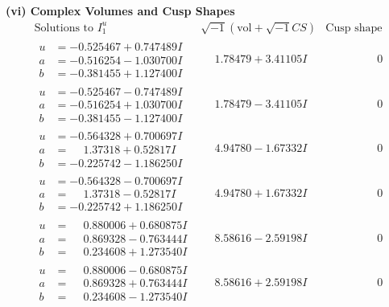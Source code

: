 \documentclass[1p]{elsarticle_modified}
\theoremstyle{definition}
\newcommand{\I}{\sqrt{-1}}
\begin{document}
\newpage\flushleft \textbf{(vi) Complex Volumes and Cusp Shapes}
$$\begin{array}{c|c|c}  
\text{Solutions to }I^u_{1}& \I (\text{vol} + \sqrt{-1}CS) & \text{Cusp shape}\\
 \hline 
\begin{aligned}
u &= -0.525467 + 0.747489 I \\
a &= -0.516254 - 1.030700 I \\
b &= -0.381455 + 1.127400 I\end{aligned}
 & \phantom{-}1.78479 + 3.41105 I & \phantom{-0.000000 } 0 \\ \hline\begin{aligned}
u &= -0.525467 - 0.747489 I \\
a &= -0.516254 + 1.030700 I \\
b &= -0.381455 - 1.127400 I\end{aligned}
 & \phantom{-}1.78479 - 3.41105 I & \phantom{-0.000000 } 0 \\ \hline\begin{aligned}
u &= -0.564328 + 0.700697 I \\
a &= \phantom{-}1.37318 + 0.52817 I \\
b &= -0.225742 - 1.186250 I\end{aligned}
 & \phantom{-}4.94780 - 1.67332 I & \phantom{-0.000000 } 0 \\ \hline\begin{aligned}
u &= -0.564328 - 0.700697 I \\
a &= \phantom{-}1.37318 - 0.52817 I \\
b &= -0.225742 + 1.186250 I\end{aligned}
 & \phantom{-}4.94780 + 1.67332 I & \phantom{-0.000000 } 0 \\ \hline\begin{aligned}
u &= \phantom{-}0.880006 + 0.680875 I \\
a &= \phantom{-}0.869328 - 0.763444 I \\
b &= \phantom{-}0.234608 + 1.273540 I\end{aligned}
 & \phantom{-}8.58616 - 2.59198 I & \phantom{-0.000000 } 0 \\ \hline\begin{aligned}
u &= \phantom{-}0.880006 - 0.680875 I \\
a &= \phantom{-}0.869328 + 0.763444 I \\
b &= \phantom{-}0.234608 - 1.273540 I\end{aligned}
 & \phantom{-}8.58616 + 2.59198 I & \phantom{-0.000000 } 0 \\ \hline\begin{aligned}

\end{aligned}
\end{array}$$
\end{document}
